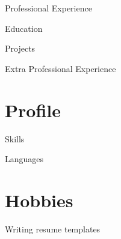 \documentclass[10pt]{fsresume}
\begin{document}
  \begin{LeftColumn}
    \begin{TitleBlock}
      \MakeCvTitle
    \end{TitleBlock}
    \begin{ExperienceBlock}
      \begin{ExperienceSection}{Professional Experience}
      \end{ExperienceSection}
      \begin{ExperienceSection}{Education}
      \end{ExperienceSection}
      \begin{ExperienceSection}{Projects}
      \end{ExperienceSection}
      \begin{ExperienceSection}{Extra Professional Experience}
      \end{ExperienceSection}
    \end{ExperienceBlock}
  \end{LeftColumn}
  \hspace{0.01\textwidth}\GrayVRule\hspace{0.01\textwidth}
  \begin{ProfileColumn}
    \section*{Profile}
    \lipsum[66]
    \begin{SkillsSection}{Skills}
    \end{SkillsSection}
    \begin{SkillsSection}{Languages}
    \end{SkillsSection}
      \section*{Hobbies}
      Writing resume templates
  \end{ProfileColumn}
\end{document}
